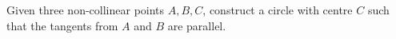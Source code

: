 Given three non-collinear points $A,B,C$,  construct a circle with centre $C$ such that the tangents from $A$ and $B$ are parallel.